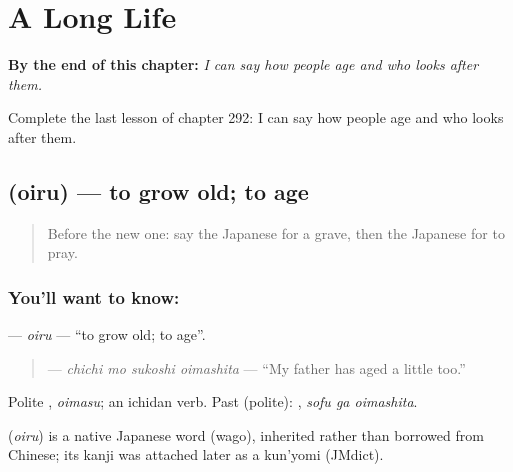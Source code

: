 
\chapter{A Long Life}
\label{ch:ja-a-long-life}

\begin{chapteropening}
\textbf{By the end of this chapter:} \emph{I can say how people age and who looks after them.}

Complete the last lesson of chapter 292: I can say how people age and who looks after them.
\end{chapteropening}

\section[\texorpdfstring{\ja{おいる} (oiru)}{おいる (oiru)}]{ (oiru) — to grow old; to age}

\label{lesson:JA-C292-oiru}



\begin{quote}
Before the new one: say the Japanese for a grave, then the Japanese for to pray.
\end{quote}

\subsection*{You'll want to know: }
\textbf{} — \emph{oiru} — \textquotedblleft{}to grow old; to age\textquotedblright{}.

\begin{quote}
\textbf{  } — \emph{chichi mo sukoshi oimashita} — \textquotedblleft{}My father has aged a little too.\textquotedblright{}
\end{quote}

Polite \textbf{}, \emph{oimasu}; an ichidan verb. Past (polite): \textbf{ }, \emph{sofu ga oimashita}.

\begin{cousinweb}
\textbf{} (\emph{oiru}) is a native Japanese word (wago), inherited rather than borrowed from Chinese; its kanji was attached later as a kun'yomi (JMdict).
\end{cousinweb}

